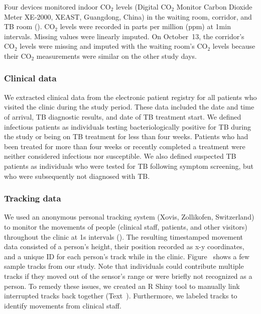 \documentclass[fleqn,11pt]{wlscirep}
\begin{document}
Four devices monitored indoor CO$_2$ levels (Digital CO$_2$ Monitor Carbon Dioxide Meter XE-2000, XEAST, Guangdong, China) in the waiting room, corridor, and TB room (). CO$_2$ levels were recorded in parts per million (ppm) at 1min intervals. Missing values were linearly imputed. On October~13, the corridor's CO$_2$ levels were missing and imputed with the waiting room's CO$_2$ levels because their CO$_2$ measurements were similar on the other study days.    

\subsubsection{Clinical data}

We extracted clinical data from the electronic patient registry for all patients who visited the clinic during the study period. These data included the date and time of arrival, TB diagnostic results, and date of TB treatment start. We defined infectious patients as individuals testing bacteriologically positive for TB during the study or being on TB treatment for less than four weeks. Patients who had been treated for more than four weeks or recently completed a treatment were neither considered infectious nor susceptible. We also defined suspected TB patients as individuals who were tested for TB following symptom screening, but who were subsequently not diagnosed with TB. 

\subsubsection{Tracking data}

We used an anonymous personal tracking system (Xovis, Zollikofen, Switzerland) to monitor the movements of people (clinical staff, patients, and other visitors) throughout the clinic at 1s intervals (). The resulting timestamped movement data consisted of a person’s height, their position recorded as x-y coordinates, and a unique ID for each person's track while in the clinic. \supp Figure~ shows a few sample tracks from our study. Note that individuals could contribute multiple tracks if they moved out of the sensor's range or were briefly not recognized as a person. To remedy these issues, we created an R Shiny tool to manually link interrupted tracks back together (\supp Text~). Furthermore, we labeled tracks to identify movements from clinical staff.  
\end{document}
